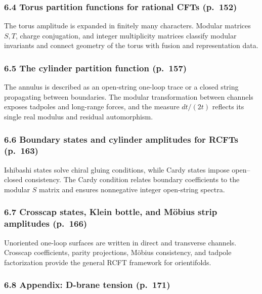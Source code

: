 \documentclass[
  10pt,
  a4paper,
  openany]{book}
\begin{document}
\subsubsection{6.4 Torus partition functions for rational CFTs
(p.~152)}\label{torus-partition-functions-for-rational-cfts-p.-152}

The torus amplitude is expanded in finitely many characters. Modular
matrices \(S,T\), charge conjugation, and integer multiplicity matrices
classify modular invariants and connect geometry of the torus with
fusion and representation data.

\subsubsection{6.5 The cylinder partition function
(p.~157)}\label{the-cylinder-partition-function-p.-157}

The annulus is described as an open-string one-loop trace or a closed
string propagating between boundaries. The modular transformation
between channels exposes tadpoles and long-range forces, and the measure
\(dt/(2t)\) reflects its single real modulus and residual automorphism.

\subsubsection{6.6 Boundary states and cylinder amplitudes for RCFTs
(p.~163)}\label{boundary-states-and-cylinder-amplitudes-for-rcfts-p.-163}

Ishibashi states solve chiral gluing conditions, while Cardy states
impose open--closed consistency. The Cardy condition relates boundary
coefficients to the modular \(S\) matrix and ensures nonnegative integer
open-string spectra.

\subsubsection{6.7 Crosscap states, Klein bottle, and Möbius strip
amplitudes
(p.~166)}\label{crosscap-states-klein-bottle-and-muxf6bius-strip-amplitudes-p.-166}

Unoriented one-loop surfaces are written in direct and transverse
channels. Crosscap coefficients, parity projections, Möbius consistency,
and tadpole factorization provide the general RCFT framework for
orientifolds.

\subsubsection{6.8 Appendix: D-brane tension
(p.~171)}\label{appendix-d-brane-tension-p.-171}
\end{document}
